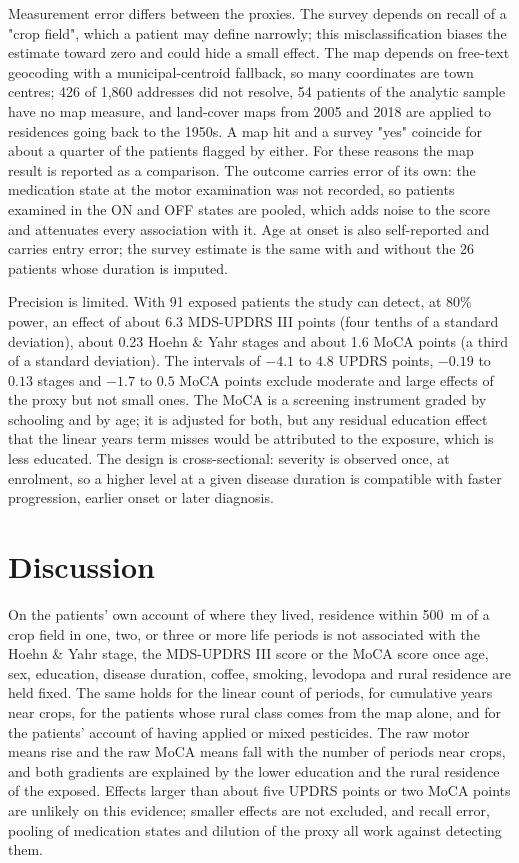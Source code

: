 \documentclass[11pt,a4paper]{article}
\begin{document}
Measurement error differs between the proxies. The survey depends on recall of a "crop field", which a patient may define narrowly; this misclassification biases the estimate toward zero and could hide a small effect. The map depends on free-text geocoding with a municipal-centroid fallback, so many coordinates are town centres; 426 of 1,860 addresses did not resolve, 54 patients of the analytic sample have no map measure, and land-cover maps from 2005 and 2018 are applied to residences going back to the 1950s. A map hit and a survey "yes" coincide for about a quarter of the patients flagged by either. For these reasons the map result is reported as a comparison. The outcome carries error of its own: the medication state at the motor examination was not recorded, so patients examined in the ON and OFF states are pooled, which adds noise to the score and attenuates every association with it. Age at onset is also self-reported and carries entry error; the survey estimate is the same with and without the 26 patients whose duration is imputed.

Precision is limited. With 91 exposed patients the study can detect, at 80\% power, an effect of about 6.3 MDS-UPDRS III points (four tenths of a standard deviation), about 0.23 Hoehn \& Yahr stages and about 1.6 MoCA points (a third of a standard deviation). The intervals of $-4.1$ to $4.8$ UPDRS points, $-0.19$ to $0.13$ stages and $-1.7$ to $0.5$ MoCA points exclude moderate and large effects of the proxy but not small ones. The MoCA is a screening instrument graded by schooling and by age; it is adjusted for both, but any residual education effect that the linear years term misses would be attributed to the exposure, which is less educated. The design is cross-sectional: severity is observed once, at enrolment, so a higher level at a given disease duration is compatible with faster progression, earlier onset or later diagnosis.

\section{Discussion}

On the patients' own account of where they lived, residence within 500~m of a crop field in one, two, or three or more life periods is not associated with the Hoehn \& Yahr stage, the MDS-UPDRS III score or the MoCA score once age, sex, education, disease duration, coffee, smoking, levodopa and rural residence are held fixed. The same holds for the linear count of periods, for cumulative years near crops, for the patients whose rural class comes from the map alone, and for the patients' account of having applied or mixed pesticides. The raw motor means rise and the raw MoCA means fall with the number of periods near crops, and both gradients are explained by the lower education and the rural residence of the exposed. Effects larger than about five UPDRS points or two MoCA points are unlikely on this evidence; smaller effects are not excluded, and recall error, pooling of medication states and dilution of the proxy all work against detecting them.
\end{document}
